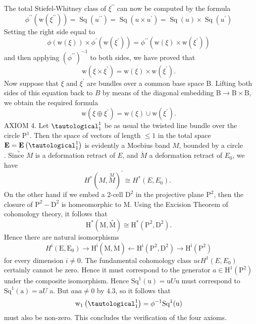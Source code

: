 \documentclass[10pt]{article}
\begin{document}
The total Stiefel-Whitney class of $\xi^{\prime \prime}$ can now be computed by the formula
$$
\phi^{\prime \prime}\left(\mathrm{w}\left(\xi^{\prime \prime}\right)\right)=\operatorname{Sq}\left(u^{\prime \prime}\right)=\operatorname{Sq}\left(u \times u^{\prime}\right)=\operatorname{Sq}(u) \times \operatorname{Sq}\left(u^{\prime}\right)
$$
Setting the right side equal to
$$
\phi(\mathrm{w}(\xi)) \times \phi^{\prime}\left(\mathrm{w}\left(\xi^{\prime}\right)\right)=\phi^{\prime \prime}\left(\mathrm{w}(\xi) \times \mathrm{w}\left(\xi^{\prime}\right)\right)
$$
and then applying $\left(\phi^{\prime \prime}\right)^{-1}$ to both sides, we have proved that
$$
\mathrm{w}\left(\xi \times \xi^{\prime}\right)=\mathrm{w}(\xi) \times \mathrm{w}\left(\xi^{\prime}\right) .
$$
Now suppose that $\xi$ and $\xi^{\prime}$ are bundles over a common base space B. Lifting both sides of this equation back to $B$ by means of the diagonal embedding $\mathrm{B} \rightarrow \mathrm{B} \times \mathrm{B}$, we obtain the required formula
$$
\mathrm{w}\left(\xi \oplus \xi^{\prime}\right)=\mathrm{w}(\xi) \cup \mathrm{w}\left(\xi^{\prime}\right) .
$$
AXIOM 4. Let $\tautological_{1}^{1}$ be as usual the twisted line bundle over the circle $\mathrm{P}^{1}$. Then the space of vectors of length $\leq 1$ in the total space $\mathbf{E}=\mathbf{E}\left(\tautological_{1}^{1}\right)$ is evidently a Moebius band $M$, bounded by a circle $\stackrel{\circ}{\text {. Since } M}$ is a deformation retract of $E$, and $\dot{M}$ a deformation retract of $E_{0}$, we have
$$
H^{*}(M, \stackrel{M}{M})^{\prime} \cong H^{*}\left(E, E_{0}\right) \text {. }
$$
On the other hand if we embed a 2-cell $\mathrm{D}^{2}$ in the projective plane $\mathrm{P}^{2}$, then the closure of $\mathrm{P}^{2}-\mathrm{D}^{2}$ is homeomorphic to M. Using the Excision Theorem of cohomology theory, it follows that
$$
\mathrm{H}^{*}(\mathrm{M}, \stackrel{\circ}{\mathrm{M}}) \cong \mathrm{H}^{*}\left(\mathrm{P}^{2}, \mathrm{D}^{2}\right) .
$$
Hence there are natural isomorphisms
$$
H^{\mathrm{i}}\left(\mathrm{E}, \mathrm{E}_{0}\right) \rightarrow \mathrm{H}^{\mathrm{i}}(\mathrm{M}, \dot{\mathrm{M}}) \leftarrow \mathrm{H}^{\mathrm{i}}\left(\mathrm{P}^{2}, \mathrm{D}^{2}\right) \rightarrow \mathrm{H}^{\mathrm{i}}\left(\mathrm{P}^{2}\right)
$$
for every dimension $i \neq 0$. The fundamental cohomology class $u \epsilon H^{1}\left(E, E_{0}\right)$ certainly cannot be zero. Hence it must correspond to the generator $a \in \mathrm{H}^{1}\left(\mathrm{P}^{2}\right)$ under the composite isomorphism. Hence $\mathrm{Sq}^{1}(\mathrm{u})=\mathrm{u} U \mathrm{u}$ must correspond to $\mathrm{Sq}^{1}(\mathrm{a})=\mathrm{a} U$ a. But $a \mathrm{a} a \neq 0$ by $4.3$, so it follows that
$$
\mathrm{w}_{1}\left(\tautological_{1}^{1}\right)=\phi^{-1} \mathrm{Sq}^{1}(\mathrm{u})
$$
must also be non-zero. This concludes the verification of the four axioms.
\end{document}
